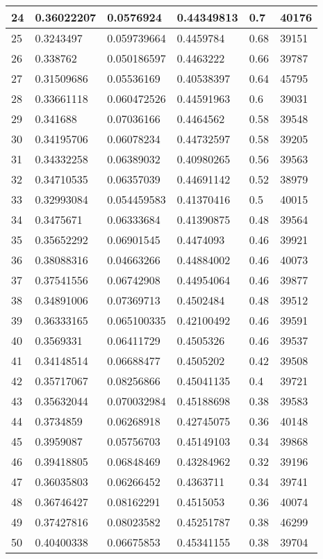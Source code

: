 \begin{longtable}{|l|l|l|l|l|l|}
24 & 0.36022207 & 0.0576924 & 0.44349813 & 0.7 & 40176 \\ \hline 
25 & 0.3243497 & 0.059739664 & 0.4459784 & 0.68 & 39151 \\ \hline 
26 & 0.338762 & 0.050186597 & 0.4463222 & 0.66 & 39787 \\ \hline 
27 & 0.31509686 & 0.05536169 & 0.40538397 & 0.64 & 45795 \\ \hline 
28 & 0.33661118 & 0.060472526 & 0.44591963 & 0.6 & 39031 \\ \hline 
29 & 0.341688 & 0.07036166 & 0.4464562 & 0.58 & 39548 \\ \hline 
30 & 0.34195706 & 0.06078234 & 0.44732597 & 0.58 & 39205 \\ \hline 
31 & 0.34332258 & 0.06389032 & 0.40980265 & 0.56 & 39563 \\ \hline 
32 & 0.34710535 & 0.06357039 & 0.44691142 & 0.52 & 38979 \\ \hline 
33 & 0.32993084 & 0.054459583 & 0.41370416 & 0.5 & 40015 \\ \hline 
34 & 0.3475671 & 0.06333684 & 0.41390875 & 0.48 & 39564 \\ \hline 
35 & 0.35652292 & 0.06901545 & 0.4474093 & 0.46 & 39921 \\ \hline 
36 & 0.38088316 & 0.04663266 & 0.44884002 & 0.46 & 40073 \\ \hline 
37 & 0.37541556 & 0.06742908 & 0.44954064 & 0.46 & 39877 \\ \hline 
38 & 0.34891006 & 0.07369713 & 0.4502484 & 0.48 & 39512 \\ \hline 
39 & 0.36333165 & 0.065100335 & 0.42100492 & 0.46 & 39591 \\ \hline 
40 & 0.3569331 & 0.06411729 & 0.4505326 & 0.46 & 39537 \\ \hline 
41 & 0.34148514 & 0.06688477 & 0.4505202 & 0.42 & 39508 \\ \hline 
42 & 0.35717067 & 0.08256866 & 0.45041135 & 0.4 & 39721 \\ \hline 
43 & 0.35632044 & 0.070032984 & 0.45188698 & 0.38 & 39583 \\ \hline 
44 & 0.3734859 & 0.06268918 & 0.42745075 & 0.36 & 40148 \\ \hline 
45 & 0.3959087 & 0.05756703 & 0.45149103 & 0.34 & 39868 \\ \hline 
46 & 0.39418805 & 0.06848469 & 0.43284962 & 0.32 & 39196 \\ \hline 
47 & 0.36035803 & 0.06266452 & 0.4363711 & 0.34 & 39741 \\ \hline 
48 & 0.36746427 & 0.08162291 & 0.4515053 & 0.36 & 40074 \\ \hline 
49 & 0.37427816 & 0.08023582 & 0.45251787 & 0.38 & 46299 \\ \hline 
50 & 0.40400338 & 0.06675853 & 0.45341155 & 0.38 & 39704 \\ \hline 
\end{longtable}